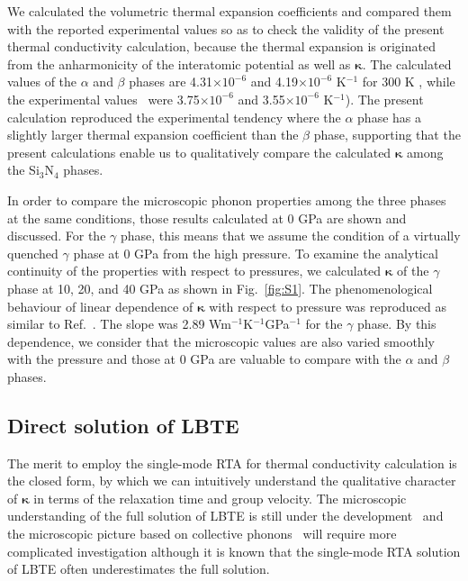 \documentclass[twocolumn,amsmath,amssymb,a4paper,prb,superscriptaddress,floatfix]{revtex4-1}
\begin{document}
We calculated the volumetric thermal expansion coefficients and compared them
with the reported experimental values so as to check the validity of the
present thermal conductivity calculation, because the thermal expansion is
originated from the anharmonicity of the interatomic potential as well as
$\boldsymbol{\kappa}$. The calculated values of the $\alpha$ and $\beta$ phases
are 4.31$\times 10^{-6}$ and 4.19$\times 10^{-6}$ K$^{-1}$ for 300 K , while
the experimental values~\cite{minikayev-alpha} were 3.75$\times 10^{-6}$ and
3.55$\times 10^{-6}$ K$^{-1}$). The present calculation reproduced the
experimental tendency where the $\alpha$ phase has a slightly larger thermal
expansion coefficient than the $\beta$ phase, supporting that the present
calculations enable us to qualitatively compare the calculated
$\boldsymbol{\kappa}$ among the Si$_3$N$_4$ phases.

In order to compare the microscopic phonon properties among the three phases at
the same conditions, those results calculated at 0 GPa are shown and discussed.
For the $\gamma$ phase, this means that we assume the condition of a virtually
quenched $\gamma$ phase at 0 GPa from the high pressure. To examine the
analytical continuity of the properties with respect to pressures, we
calculated $\boldsymbol{\kappa}$ of the $\gamma$ phase at 10, 20, and 40 GPa as
shown in Fig.~\ref{fig:S1}. The phenomenological behaviour of linear dependence
of $\boldsymbol{\kappa}$ with respect to pressure was reproduced as similar to
Ref.~. The slope was 2.89
Wm$^{-1}$K$^{-1}$GPa$^{-1}$ for the $\gamma$ phase.  By this dependence, we
consider that the microscopic values are also varied smoothly with the pressure
and those at 0 GPa are valuable to compare with the $\alpha$ and $\beta$
phases.

\subsection{Direct solution of LBTE}

The merit to employ the single-mode RTA for thermal conductivity calculation is
the closed form, by which we can intuitively understand the qualitative
character of $\boldsymbol{\kappa}$ in terms of the relaxation time and group velocity. The
microscopic understanding of the full solution of LBTE is still under the
development~\cite{cepellotti-relaxons} and the microscopic picture based on
collective phonons~\cite{hardy-collective} will require more complicated
investigation although it is known that the single-mode RTA solution of LBTE
often underestimates the full solution.~\cite{mukhopadhyay-ltc,ward-ltc}
\end{document}
